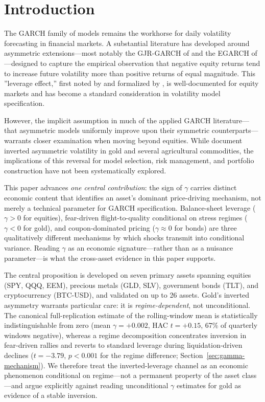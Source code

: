 

\section{Introduction}

The GARCH family of models \citep{bollerslev1986} remains the workhorse for daily volatility forecasting in financial markets. A substantial literature has developed around asymmetric extensions---most notably the GJR-GARCH of \citet{glosten1993} and the EGARCH of \citet{nelson1991}---designed to capture the empirical observation that negative equity returns tend to increase future volatility more than positive returns of equal magnitude. This ''leverage effect,'' first noted by \citet{black1976} and formalized by \citet{christie1982}, is well-documented for equity markets and has become a standard consideration in volatility model specification.

However, the implicit assumption in much of the applied GARCH literature---that asymmetric models uniformly improve upon their symmetric counterparts---warrants closer examination when moving beyond equities. While \citet{chevallier2017} document inverted asymmetric volatility in gold and several agricultural commodities, the implications of this reversal for model selection, risk management, and portfolio construction have not been systematically explored.

This paper advances \emph{one central contribution}: the sign of $\gamma$ carries distinct economic content that identifies an asset's dominant price-driving mechanism, not merely a technical parameter for GARCH specification. Balance-sheet leverage ($\gamma > 0$ for equities), fear-driven flight-to-quality conditional on stress regimes ($\gamma < 0$ for gold), and coupon-dominated pricing ($\gamma \approx 0$ for bonds) are three qualitatively different mechanisms by which shocks transmit into conditional variance. Reading $\gamma$ as an economic signature---rather than as a nuisance parameter---is what the cross-asset evidence in this paper supports.

The central proposition is developed on seven primary assets spanning equities (SPY, QQQ, EEM), precious metals (GLD, SLV), government bonds (TLT), and cryptocurrency (BTC-USD), and validated on up to 26 assets. Gold's inverted asymmetry warrants particular care: it is \emph{regime-dependent}, not unconditional. The canonical full-replication estimate of the rolling-window mean is statistically indistinguishable from zero (mean $\gamma = +0.002$, HAC $t = +0.15$, 67\% of quarterly windows negative), whereas a regime decomposition concentrates inversion in fear-driven rallies and reverts to standard leverage during liquidation-driven declines ($t = -3.79$, $p < 0.001$ for the regime difference; Section~\ref{sec:gamma-mechanism}). We therefore treat the inverted-leverage channel as an economic phenomenon conditional on regime---not a permanent property of the asset class---and argue explicitly against reading unconditional $\gamma$ estimates for gold as evidence of a stable inversion.

